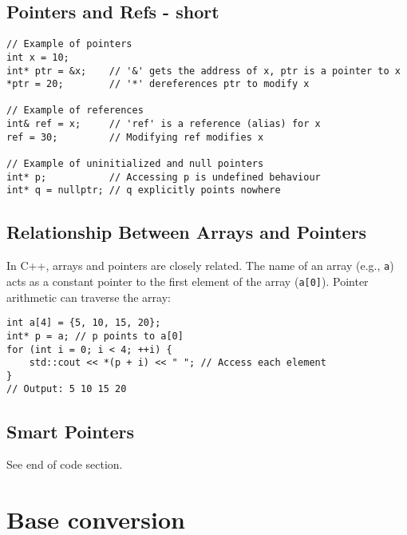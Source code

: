 \subsection{Pointers and Refs - short}
\begin{lstlisting}[style = codeexpert]
// Example of pointers
int x = 10; 
int* ptr = &x;    // '&' gets the address of x, ptr is a pointer to x
*ptr = 20;        // '*' dereferences ptr to modify x

// Example of references
int& ref = x;     // 'ref' is a reference (alias) for x
ref = 30;         // Modifying ref modifies x

// Example of uninitialized and null pointers
int* p;           // Accessing p is undefined behaviour
int* q = nullptr; // q explicitly points nowhere
\end{lstlisting}

\subsection{Relationship Between Arrays and Pointers}
In C++, arrays and pointers are closely related. The name of an array (e.g., \texttt{a}) acts as a constant pointer to the first element of the array (\texttt{a[0]}). Pointer arithmetic can traverse the array:
\begin{lstlisting}[style=codeexpert]
int a[4] = {5, 10, 15, 20};
int* p = a; // p points to a[0]
for (int i = 0; i < 4; ++i) {
    std::cout << *(p + i) << " "; // Access each element
}
// Output: 5 10 15 20
\end{lstlisting}

\subsection{Smart Pointers}
See end of code section.

\section{Base conversion}

